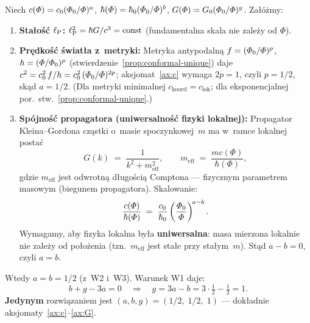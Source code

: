 \begin{theorem}\label{thm:exponents}
Niech $c(\varPhi) = c_0(\varPhi_0/\varPhi)^a$,
$\hbar(\varPhi) = \hbar_0(\varPhi_0/\varPhi)^b$,
$G(\varPhi) = G_0(\varPhi_0/\varPhi)^g$. Za\l{}\'o\.zmy:
\begin{enumerate}[nosep]
  \item[(W1)] \textbf{Sta\l{}o\'s\'c $\ell_{\mathrm{P}}$:}
    $\ell_{\mathrm{P}}^2 = \hbar G/c^3 = \mathrm{const}$
    (fundamentalna skala nie zale\.zy od $\Phi$).
  \item[(W2)] \textbf{Pr\k{e}dko\'s\'c \'swiat\l{}a z~metryki:}
    Metryka antypodaln\k{a} $f = (\varPhi_0/\varPhi)^p$,
    $h = (\varPhi/\varPhi_0)^p$ (stwierdzenie~\ref{prop:conformal-unique})
    daje $c^2 = c_0^2\,f/h
    = c_0^2\,(\varPhi_0/\varPhi)^{2p}$; aksjomat~\ref{ax:c}
    wymaga $2p = 1$, czyli $p = 1/2$, sk\k{a}d $a = 1/2$.
    (Dla metryki minimalnej $c_{\mathrm{koord}} = c_{\mathrm{lok}}$;
    dla eksponencjalnej por.\ stw.~\ref{prop:conformal-unique}.)
  \item[(W3)] \textbf{Sp\'ojno\'s\'c propagatora (uniwersalno\'s\'c
    fizyki lokalnej):}
    Propagator Kleina--Gordona cz\k{a}stki o~masie spoczynkowej~$m$
    ma w~ramce lokalnej posta\'c
    \[
      G(k) \;=\; \frac{1}{k^2 + m_{\mathrm{eff}}^2},
      \qquad
      m_{\mathrm{eff}} \;=\; \frac{mc(\Phi)}{\hbar(\Phi)},
    \]
    gdzie $m_{\mathrm{eff}}$ jest odwrotn\k{a} d\l{}ugo\'sci\k{a}
    Comptona --- fizycznym parametrem masowym
    (biegunem propagatora). Skalowanie:
    \[
      \frac{c(\varPhi)}{\hbar(\varPhi)}
      \;=\; \frac{c_0}{\hbar_0}
            \left(\frac{\varPhi_0}{\varPhi}\right)^{\!a-b}.
    \]
    Wymag\-amy, aby fizyka lokalna by\l{}a \textbf{uniwersalna}:
    masa mierzona lokalnie nie zale\.zy od po\l{}o\.zenia
    (tzn.\ $m_{\mathrm{eff}}$ jest sta\l{}e przy sta\l{}ym~$m$).
    St\k{a}d $a - b = 0$, czyli $a = b$.
\end{enumerate}
Wtedy $a = b = 1/2$ (z~W2 i~W3). Warunek W1 daje:
\begin{equation}
  b + g - 3a = 0
  \quad\Longrightarrow\quad
  g = 3a - b = 3\cdot\tfrac{1}{2} - \tfrac{1}{2} = 1.
\end{equation}
\textbf{Jedynym} rozwi\k{a}zaniem jest $(a,b,g) = (1/2,\;1/2,\;1)$
--- dok\l{}adnie aksjomaty~\ref{ax:c}--\ref{ax:G}.
\end{theorem}

